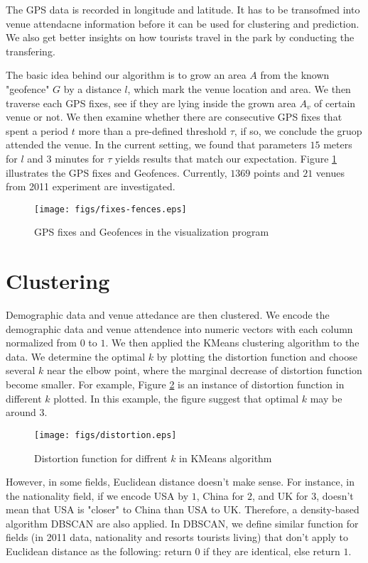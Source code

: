 \documentclass[12pt]{article}
\begin{document}
The GPS data is recorded in longitude and latitude. It has to be transofmed into venue attendacne information before it can be used for clustering and prediction. We also get better insights on how tourists travel in the park by conducting the transfering.

The basic idea behind our algorithm is to grow an area $A$ from the known "geofence" $G$ by a distance $l$, which mark the venue location and area. We then traverse each GPS fixes, see if they are lying inside the grown area $A_v$ of certain venue or not. We then examine whether there are consecutive GPS fixes that spent a period $t$ more than a pre-defined threshold $\tau$, if so, we conclude the gruop attended the venue. In the current setting, we found that parameters $15$ meters for $l$ and $3$ minutes for $\tau$ yields results that match our expectation. Figure \ref{fixes-fences} illustrates the GPS fixes and Geofences. Currently, $1369$ points and $21$ venues from 2011 experiment are investigated.  

\begin{figure}
\centering
    \texttt{[image: figs/fixes-fences.eps]}
\caption{GPS fixes and Geofences in the visualization program}
\label{fixes-fences}
\end{figure}

\section{Clustering}\label{clustering}
Demographic data and venue attedance are then clustered. We encode the demographic data and venue attendence into numeric vectors with each column normalized from $0$ to $1$. We then applied the KMeans clustering algorithm \cite{Lloyd82} to the data. We determine the optimal $k$ by plotting the distortion function and choose several $k$ near the elbow point, where the marginal decrease of distortion function become smaller. For example, Figure \ref{kmeans-k} is an instance of distortion function in different $k$ plotted. In this example, the figure suggest that optimal $k$ may be around $3$.

\begin{figure}
\centering
    \texttt{[image: figs/distortion.eps]}
\caption{Distortion function for diffrent $k$ in KMeans algorithm}
\label{kmeans-k}
\end{figure}

However, in some fields, Euclidean distance doesn't make sense. For instance, in the nationality field, if we encode USA by $1$, China for $2$, and UK for $3$, doesn't mean that USA is "closer" to China than USA to UK. Therefore, a density-based algorithm DBSCAN \cite{Ester96} are also applied. In DBSCAN, we define similar function for fields (in 2011 data, nationality and resorts tourists living) that don't apply to Euclidean distance as the following: return $0$ if they are identical, else return $1$.
\end{document}
